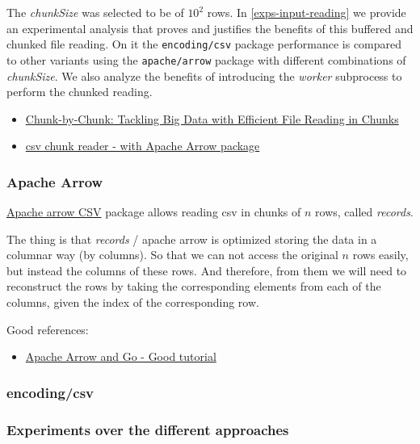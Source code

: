 \documentclass[12pt,a4paper]{article}
\begin{document}
The \emph{chunkSize} was selected to be of $10^2$ rows. In \ref{exps-input-reading} we provide an experimental analysis that proves and justifies the benefits of this buffered and chunked file reading. On it the \texttt{encoding/csv} package performance is compared to other variants using the \texttt{apache/arrow} package with different combinations of \emph{chunkSize}. We also analyze the benefits of introducing the \textit{worker} subprocess to perform the chunked reading.

\begin{itemize}
  \item \href{https://medium.com/@anuragv.1020/chunk-by-chunk-tackling-big-data-with-efficient-file-reading-in-chunks-c6f7cf153ccd}{Chunk-by-Chunk: Tackling Big Data with Efficient File Reading in Chunks}
  \item \href{https://pkg.go.dev/github.com/apache/arrow/go/arrow/csv#NewReader}{csv chunk reader - with Apache Arrow package}
\end{itemize}

\subsubsection{Apache Arrow}

\href{https://pkg.go.dev/github.com/apache/arrow/go/v12@v12.0.1/arrow/csv}{Apache arrow CSV}
package allows reading csv in chunks of $n$ rows, called \emph{records}.

The thing is that \emph{records} / apache arrow is optimized storing the data in a columnar way (by columns). So that we can not access the original $n$ rows easily, but instead the columns of these rows. And therefore, from them we will need to reconstruct the rows by taking the corresponding elements from each of the columns, given the index of the corresponding row.

Good references:
\begin{itemize}
  \item \href{https://www.apachecon.com/acna2022/slides/01_Topol_Arrow_and_Go.pdf}{Apache Arrow and Go - Good tutorial}
\end{itemize}


\subsubsection{encoding/csv}

\subsubsection{Experiments over the different approaches}
\end{document}
